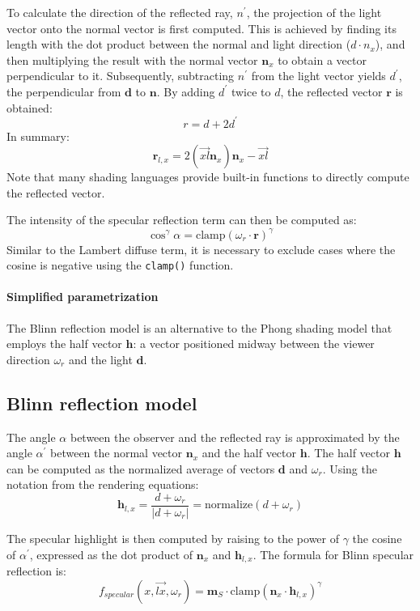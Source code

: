 To calculate the direction of the reflected ray, $n^\prime$, the projection of the light vector onto the normal vector is first computed.
This is achieved by finding its length with the dot product between the normal and light direction ($d\cdot n_x$), and then multiplying the result with the normal vector $\mathbf{n}_x$ to obtain a vector perpendicular to it.
Subsequently, subtracting $n^\prime$  from the light vector yields $d^\prime$, the perpendicular from $\mathbf{d}$ to $\mathbf{n}$. 
By adding $d^\prime$ twice to $d$, the reflected vector $\mathbf{r}$ is obtained: 
\[r=d+2d^\prime\]
In summary:
\[\mathbf{r}_{l,x}=2\left(\overrightarrow{xl}\mathbf{n}_x\right)\mathbf{n}_x-\overrightarrow{xl}\]
Note that many shading languages provide built-in functions to directly compute the reflected vector. 

The intensity of the specular reflection term can then be computed as:
\[\cos^\gamma\alpha=\text{clamp}(\omega_r\cdot\mathbf{r})^\gamma\]
Similar to the Lambert diffuse term, it is necessary to exclude cases where the cosine is negative using the \texttt{clamp()} function.

\paragraph*{Simplified parametrization}
The Blinn reflection model is an alternative to the Phong shading model that employs the half vector $\mathbf{h}$: a vector positioned midway between the viewer direction $\omega_r$ and the light $\mathbf{d}$.

\subsection{Blinn reflection model}
The angle $\alpha$ between the observer and the reflected ray is approximated by the angle $\alpha^\prime$ between the normal vector $\mathbf{n}_x$ and the half vector $\mathbf{h}$.
The half vector $\mathbf{h}$ can be computed as the normalized average of vectors $\mathbf{d}$ and $\omega_r$. 
Using the notation from the rendering equations:
\[\mathbf{h}_{l,x}=\dfrac{d+\omega_r}{\left\lvert d+\omega_r \right\rvert }=\text{normalize}(d+\omega_r)\]

The specular highlight is then computed by raising to the power of $\gamma$ the cosine of $\alpha^\prime$, expressed as the dot product of $\mathbf{n}_x$ and $\mathbf{h}_{l,x}$. 
The formula for Blinn specular reflection is:
\[f_{specular}(x,\overrightarrow{lx},\omega_r)=\mathbf{m}_S\cdot\text{clamp}(\mathbf{n}_x\cdot\mathbf{h}_{l,x})^\gamma\]

